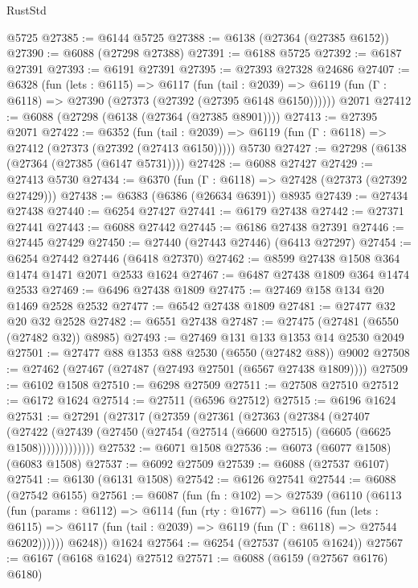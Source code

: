 \begin{lexlean}{RustStd}
\begin{coremodule}
    @5725
@27385 := @6144 @5725
@27388 := @6138 (@27364 (@27385 @6152))
@27390 := @6088 (@27298 @27388)
@27391 := @6188 @5725
@27392 := @6187 @27391
@27393 := @6191 @27391
@27395 := @27393 @27328 @24686
@27407 := @6328
    (fun (lets : @6115) =>
    @6117
      (fun (tail : @2039) =>
      @6119 (fun (Γ : @6118) => @27390 (@27373 (@27392 (@27395 @6148 @6150))))))
    @2071
@27412 := @6088 (@27298 (@6138 (@27364 (@27385 @8901))))
@27413 := @27395 @2071
@27422 := @6352
    (fun (tail : @2039) => @6119 (fun (Γ : @6118) => @27412 (@27373 (@27392 (@27413 @6150)))))
    @5730
@27427 := @27298 (@6138 (@27364 (@27385 (@6147 @5731))))
@27428 := @6088 @27427
@27429 := @27413 @5730
@27434 := @6370 (fun (Γ : @6118) => @27428 (@27373 (@27392 @27429)))
@27438 := @6383 (@6386 (@26634 @6391)) @8935
@27439 := @27434 @27438
@27440 := @6254 @27427
@27441 := @6179 @27438
@27442 := @27371 @27441
@27443 := @6088 @27442
@27445 := @6186 @27438 @27391
@27446 := @27445 @27429
@27450 := @27440 (@27443 @27446) (@6413 @27297)
@27454 := @6254 @27442 @27446 (@6418 @27370)
@27462 := @8599 @27438 @1508 @364 @1474 @1471 @2071 @2533 @1624
@27467 := @6487 @27438 @1809 @364 @1474 @2533
@27469 := @6496 @27438 @1809
@27475 := @27469 @158 @134 @20 @1469 @2528 @2532
@27477 := @6542 @27438 @1809
@27481 := @27477 @32 @20 @32 @2528
@27482 := @6551 @27438
@27487 := @27475 (@27481 (@6550 (@27482 @32)) @8985)
@27493 := @27469 @131 @133 @1353 @14 @2530 @2049
@27501 := @27477 @88 @1353 @88 @2530 (@6550 (@27482 @88)) @9002
@27508 := @27462 (@27467 (@27487 (@27493 @27501 (@6567 @27438 @1809))))
@27509 := @6102 @1508
@27510 := @6298 @27509
@27511 := @27508 @27510
@27512 := @6172 @1624
@27514 := @27511 (@6596 @27512)
@27515 := @6196 @1624
@27531 := @27291
    (@27317
      (@27359
        (@27361
          (@27363
            (@27384
              (@27407
                (@27422
                  (@27439 (@27450 (@27454 (@27514 (@6600 @27515) (@6605 (@6625 @1508)))))))))))))
@27532 := @6071 @1508
@27536 := @6073 (@6077 @1508) (@6083 @1508)
@27537 := @6092 @27509
@27539 := @6088 (@27537 @6107)
@27541 := @6130 (@6131 @1508)
@27542 := @6126 @27541
@27544 := @6088 (@27542 @6155)
@27561 := @6087
    (fun (fn : @102) =>
    @27539
      (@6110
        (@6113
          (fun (params : @6112) =>
          @6114
            (fun (rty : @1677) =>
            @6116
              (fun (lets : @6115) =>
              @6117 (fun (tail : @2039) => @6119 (fun (Γ : @6118) => @27544 @6202))))))
        @6248))
    @1624
@27564 := @6254 (@27537 (@6105 @1624))
@27567 := @6167 (@6168 @1624) @27512
@27571 := @6088 (@6159 (@27567 @6176) @6180)

\end{coremodule}
\end{lexlean}
